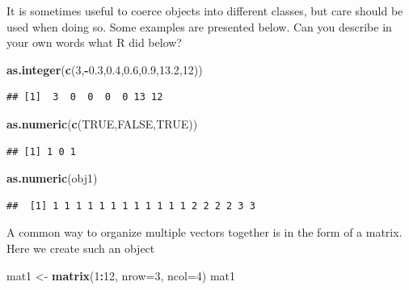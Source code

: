 \documentclass[]{book}
\newenvironment{Shaded}{\begin{snugshade}}{\end{snugshade}}
\newcommand{\KeywordTok}[1]{\textcolor[rgb]{0.13,0.29,0.53}{\textbf{#1}}}
\newcommand{\DataTypeTok}[1]{\textcolor[rgb]{0.13,0.29,0.53}{#1}}
\newcommand{\DecValTok}[1]{\textcolor[rgb]{0.00,0.00,0.81}{#1}}
\newcommand{\FloatTok}[1]{\textcolor[rgb]{0.00,0.00,0.81}{#1}}
\newcommand{\StringTok}[1]{\textcolor[rgb]{0.31,0.60,0.02}{#1}}
\newcommand{\OtherTok}[1]{\textcolor[rgb]{0.56,0.35,0.01}{#1}}
\newcommand{\OperatorTok}[1]{\textcolor[rgb]{0.81,0.36,0.00}{\textbf{#1}}}
\newcommand{\NormalTok}[1]{#1}
\theoremstyle{definition}
\theoremstyle{definition}
\theoremstyle{remark}
\begin{document}
It is sometimes useful to coerce objects into different classes, but
care should be used when doing so. Some examples are presented below.
Can you describe in your own words what R did below?

\begin{Shaded}
\begin{Highlighting}[]
\KeywordTok{as.integer}\NormalTok{(}\KeywordTok{c}\NormalTok{(}\DecValTok{3}\NormalTok{,}\OperatorTok{-}\FloatTok{0.3}\NormalTok{,}\FloatTok{0.4}\NormalTok{,}\FloatTok{0.6}\NormalTok{,}\FloatTok{0.9}\NormalTok{,}\FloatTok{13.2}\NormalTok{,}\DecValTok{12}\NormalTok{))}
\end{Highlighting}
\end{Shaded}

\begin{verbatim}
## [1]  3  0  0  0  0 13 12
\end{verbatim}

\begin{Shaded}
\begin{Highlighting}[]
\KeywordTok{as.numeric}\NormalTok{(}\KeywordTok{c}\NormalTok{(}\OtherTok{TRUE}\NormalTok{,}\OtherTok{FALSE}\NormalTok{,}\OtherTok{TRUE}\NormalTok{))}
\end{Highlighting}
\end{Shaded}

\begin{verbatim}
## [1] 1 0 1
\end{verbatim}

\begin{Shaded}
\begin{Highlighting}[]
\KeywordTok{as.numeric}\NormalTok{(obj1)}
\end{Highlighting}
\end{Shaded}

\begin{verbatim}
##  [1] 1 1 1 1 1 1 1 1 1 1 1 1 2 2 2 2 3 3
\end{verbatim}

A common way to organize multiple vectors together is in the form of a
matrix. Here we create such an object

\begin{Shaded}
\begin{Highlighting}[]
\NormalTok{mat1 <-}\StringTok{ }\KeywordTok{matrix}\NormalTok{(}\DecValTok{1}\OperatorTok{:}\DecValTok{12}\NormalTok{, }\DataTypeTok{nrow=}\DecValTok{3}\NormalTok{, }\DataTypeTok{ncol=}\DecValTok{4}\NormalTok{)}
\NormalTok{mat1}
\end{Highlighting}
\end{Shaded}
\end{document}
